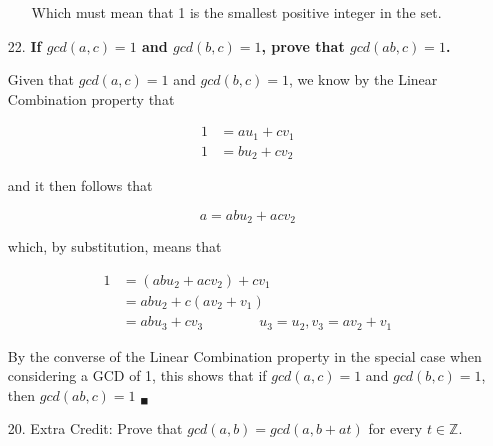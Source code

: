 \documentclass{article}
\begin{document}
\begin{enumerate}
\begin{enumerate}
				Which must mean that 1 is the smallest positive integer in the set.
		\end{enumerate}

		\item[22.]	\textbf{If $gcd(a, c) = 1$ and $gcd(b, c) = 1$, prove that $gcd(ab, c) = 1$.}

		Given that $gcd(a, c) = 1$ and $gcd(b, c) = 1$, we know by the Linear Combination property
		that 

		\begin{align*}
			1 &= au_1 + cv_1 \\
			1 &= bu_2 + cv_2
		\end{align*}

		and it then follows that

		\begin{equation*}
			a = abu_2 + acv_2
		\end{equation*}

		which, by substitution, means that

		\begin{align*}
			1 &= (abu_2 + acv_2) + cv_1 \\
			  &= abu_2 + c(av_2 + v_1) \\
			  &= abu_3 + cv_3 \qquad \qquad u_3 = u_2, v_3 = av_2 + v_1
		\end{align*}

		By the converse of the Linear Combination property in the special case when considering a 
		GCD of 1, this shows that if $gcd(a, c) = 1$ and $gcd(b, c) = 1$, then $gcd(ab, c) = 1$
		$_{\blacksquare}$

		\item[20.] 	Extra Credit: Prove that $gcd(a, b) = gcd(a, b + at)$ for every $t \in 
					\mathbb{Z}$.

	\end{enumerate}
\end{document}
